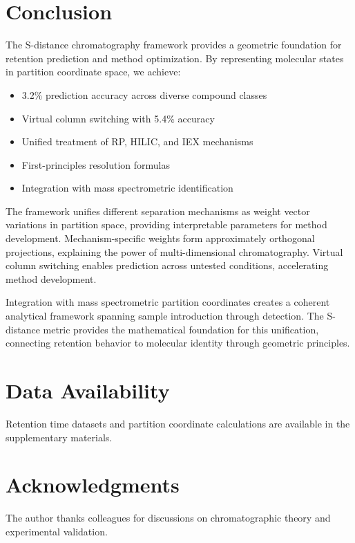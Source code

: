 \documentclass[twocolumn,10pt]{article}
\begin{document}
\section{Conclusion}

The S-distance chromatography framework provides a geometric foundation for retention prediction and method optimization. By representing molecular states in partition coordinate space, we achieve:
\begin{itemize}
\item 3.2\% prediction accuracy across diverse compound classes
\item Virtual column switching with 5.4\% accuracy
\item Unified treatment of RP, HILIC, and IEX mechanisms
\item First-principles resolution formulas
\item Integration with mass spectrometric identification
\end{itemize}

The framework unifies different separation mechanisms as weight vector variations in partition space, providing interpretable parameters for method development. Mechanism-specific weights form approximately orthogonal projections, explaining the power of multi-dimensional chromatography. Virtual column switching enables prediction across untested conditions, accelerating method development.

Integration with mass spectrometric partition coordinates creates a coherent analytical framework spanning sample introduction through detection. The S-distance metric provides the mathematical foundation for this unification, connecting retention behavior to molecular identity through geometric principles.

\section*{Data Availability}

Retention time datasets and partition coordinate calculations are available in the supplementary materials.

\section*{Acknowledgments}

The author thanks colleagues for discussions on chromatographic theory and experimental validation.



\end{document}
